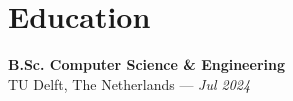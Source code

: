 \section*{Education}
\textbf{B.Sc. Computer Science \& Engineering}\\
TU Delft, The Netherlands — \textit{Jul 2024}